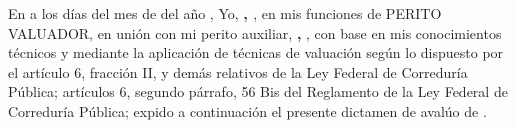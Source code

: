 En \lugarInforme{} a los \numberstringnum{\diainforme} d\'ias del mes de \monthname[\mesinforme] del a\~no \numberstringnum{\annoinforme}, Yo, \textbf{\textcolor{principal}{\nombrePerito, \descripcionPerito}}, en mis funciones de PERITO VALUADOR, en uni\'on con mi perito auxiliar, \textcolor{principal}{\textbf{\nombreAuxiliar, \descripcionAuxiliar}}, con base en mis conocimientos t\'ecnicos y mediante la aplicaci\'on de t\'ecnicas de valuaci\'on seg\'un lo dispuesto por el art\'iculo 6, fracci\'on II, y dem\'as relativos de la Ley Federal de Corredur\'ia P\'ublica; art\'iculos 6, segundo p\'arrafo, 56 Bis del Reglamento de la Ley Federal de Corredur\'ia P\'ublica; expido a continuaci\'on el presente dictamen de avalúo de \textcolor{principal}{\tipoAvaluo}.\\






